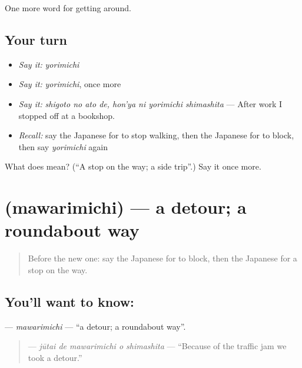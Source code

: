 \begin{grammarlens}[title={What you've built}]
One more word for getting around.
\end{grammarlens}

\subsection*{Your turn}
\begin{itemize}
\raggedright
  \item \emph{Say it:} \emph{yorimichi}
  \item \emph{Say it:} \emph{yorimichi}, once more
  \item \emph{Say it:} \emph{shigoto no ato de, hon'ya ni yorimichi shimashita} — After work I stopped off at a bookshop.
  \item \emph{Recall:} say the Japanese for to stop walking, then the Japanese for to block, then say \emph{yorimichi} again
\end{itemize}

\begin{tcolorbox}[breakable,colback=teal!4,colframe=teal!35!black,title={Before you move on}]
What does  mean? (\textquotedblleft{}A stop on the way; a side trip\textquotedblright{}.) Say it once more.
\end{tcolorbox}
\section[\texorpdfstring{\ja{まわりみち} (mawarimichi)}{まわりみち (mawarimichi)}]{ (mawarimichi) — a detour; a roundabout way}

\label{lesson:JA-C392-mawarimichi}



\begin{quote}
Before the new one: say the Japanese for to block, then the Japanese for a stop on the way.
\end{quote}

\subsection*{You'll want to know: }
\textbf{} — \emph{mawarimichi} — \textquotedblleft{}a detour; a roundabout way\textquotedblright{}.

\begin{quote}
\textbf{  } — \emph{jūtai de mawarimichi o shimashita} — \textquotedblleft{}Because of the traffic jam we took a detour.\textquotedblright{}
\end{quote}

